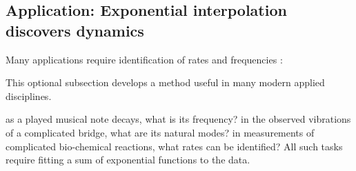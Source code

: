 









\subsection{Application: Exponential interpolation discovers dynamics}
\label{sec:eidd}


Many applications require identification of rates and frequencies \cite[e.g.]{Pereyra2010}:
\begin{aside}
This optional subsection develops a method useful in many modern applied disciplines.
\end{aside}%
as a played musical note decays, what is its frequency?
in the observed vibrations of a complicated bridge, what are its natural modes?
in measurements of complicated bio-chemical reactions, what rates can be identified?
All such tasks require fitting a sum of exponential functions to the data.



